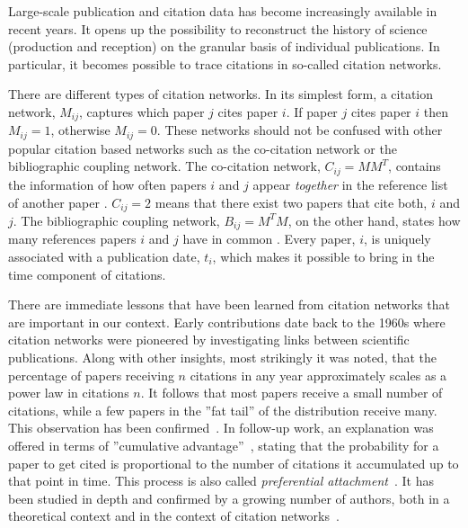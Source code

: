 \documentclass[fleqn,10pt]{wlscirep}
\begin{document}
Large-scale publication and citation data has become increasingly available in recent years. It opens up the possibility to reconstruct the history of science (production and reception) on the granular basis of individual publications. In particular, it becomes possible to trace citations in so-called citation networks.

There are different types of citation networks. In its simplest form, a citation network, $M_{ij}$, captures which paper $j$ cites paper $i$. If paper $j$ cites paper $i$ then $M_{ij} = 1$, otherwise $M_{ij} = 0$. These networks should not be confused with other popular citation based networks such as the co-citation network or the bibliographic coupling network. The co-citation network, $C_{ij} = MM^T$, contains the information of how often papers $i$ and $j$ appear {\em together} in the reference list of another paper \cite{Small1973}. $C_{ij}=2$ means that there exist two papers that cite both, $i$ and $j$. The bibliographic coupling network, $B_{ij} = M^TM$, on the other hand, states how many references papers $i$ and $j$ have in common \cite{MARTYN1964}. Every paper, $i$, is uniquely associated with a publication date, $t_i$, which makes it possible to bring in the time component of citations. 

There are immediate lessons that have been learned from citation networks that are important in our context. Early contributions date back to the 1960s \cite{deSollaPrice1965} where citation networks were pioneered by investigating links between scientific publications. Along with other insights, most strikingly it was noted, that the percentage of papers receiving $n$ citations in any year approximately scales as a power law in citations $n$. It follows that most papers receive a small number of citations, while a few papers in the ''fat tail'' of the distribution receive many. This observation has been confirmed~\cite{seglen1992, Redner1998}. In follow-up work, an explanation was offered in terms of ''cumulative advantage''~\cite{Price1976}, stating that the probability for a paper to get cited is proportional to the number of citations it accumulated up to that point in time. This process is also called \textit{preferential attachment}~\cite{Barabsi1999x}. It has been studied in depth and confirmed by a growing number of authors, both in a theoretical context and in the context of citation networks~\cite{Krapivsky2001, Dorogovtsev2002, Albert2002, Newman2003-x, Newman2001, Capocci2006, Jeong_2003}.
\end{document}
